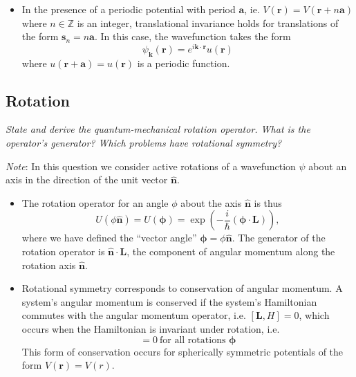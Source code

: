 \documentclass[11pt, a4paper]{article}
\newcommand{\Ham}{Hamiltonian\xspace}
\renewcommand{\vec}[1]{\bm{#1}}  %
\newcommand{\uvec}[1]{\hat{\vec{#1}}}  %
\renewcommand{\r}{\vec{r}}  %
\begin{document}
\begin{itemize}
	In free space (for a globally constant potential), momentum is conserved under the condition $ [\vec{p}, H] = 0 $, which occurs when the Hamiltonian is invariant under translation, i.e. when
	\begin{equation*}
		[U(\vec{s}), H] = 0 \ \text{for all } \vec{s} \in \mathbb{R}^{3}
	\end{equation*}
	
	\item In the presence of a periodic potential with period $ \vec{a} $, ie. $ V(\r) = V(\r + n \vec{a}) $ where $ n \in \mathbb{Z} $ is an integer, translational invariance holds for translations of the form $ \vec{s}_{n} = n \vec{a} $. In this case, the wavefunction takes the form
	\begin{equation*}
		\psi_{\vec{k}}(\r) = e^{i\vec{k}\cdot \r}u(\r)
	\end{equation*}
	where $ u(\r + \vec{a}) = u(\r) $ is a periodic function. 
	
\end{itemize}	

\subsection{Rotation}
\textit{State and derive the quantum-mechanical rotation operator. What is the operator's generator? Which problems have rotational symmetry?}

\vspace{2mm}
\textit{Note}: In this question we consider active rotations of a wavefunction $ \psi $ about an axis in the direction of the unit vector $ \uvec{n} $. 

\begin{itemize}

    \item The rotation operator for an angle $ \phi $ about the axis $ \uvec{n} $ is thus
	\begin{equation*}
		U(\phi \uvec{n}) = U(\vec{\phi}) = \exp(- \frac{i}{\hbar}(\vec{\phi}\cdot \vec{L})),
	\end{equation*}
	where we have defined the ``vector angle'' $ \vec{\phi} = \phi \uvec{n} $. The generator of the rotation operator is $ \uvec{n} \cdot \vec{L} $, the component of angular momentum along the rotation axis $ \uvec{n} $. 

	\item Rotational symmetry corresponds to conservation of angular momentum. A system's angular momentum is conserved if the system's Hamiltonian commutes with the angular momentum operator, i.e. $ [\vec{L}, H] = 0 $, which occurs when the \Ham is invariant under rotation, i.e.
	\begin{equation*}
		[U(\vec{\phi}), H] = 0 \ \text{for all rotations } \vec{\phi}
	\end{equation*}
	This form of conservation occurs for spherically symmetric potentials of the form $ V(\r) = V(r) $.
\end{itemize}
\end{document}
